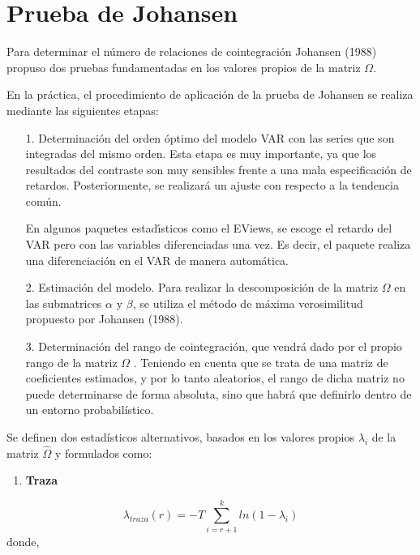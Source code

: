 \section{Prueba de Johansen}
Para determinar el n\'{u}mero de relaciones de cointegraci\'{o}n Johansen (1988) propuso dos pruebas fundamentadas en los valores propios de la matriz $\Omega$.\newline

En la pr\'{a}ctica, el procedimiento de aplicaci\'{o}n de la prueba de Johansen se realiza mediante las siguientes etapas:

\begin{enumerate}
      \item[1.] Determinaci\'{o}n del orden \'{o}ptimo del modelo VAR con las series que son integradas del mismo orden. Esta etapa es muy importante, ya que los resultados del contraste son muy sensibles frente a una mala especificaci\'{o}n de retardos. Posteriormente, se realizar\'{a} un ajuste con respecto a la tendencia com\'{u}n.
      
      En algunos paquetes estad\'{\i}sticos como el EViews, se escoge el retardo del VAR pero con las variables diferenciadas una vez. Es decir, el paquete realiza una diferenciaci\'{o}n en el VAR de manera autom\'{a}tica.

      \item[2.] Estimaci\'{o}n del modelo. Para realizar la descomposici\'{o}n de la matriz $\Omega$ en las submatrices $\alpha$ y $\beta$, se utiliza el m\'{e}todo de m\'{a}xima verosimilitud propuesto por Johansen (1988).
      \item[3.] Determinaci\'{o}n del rango de cointegraci\'{o}n, que vendr\'{a} dado por el propio rango de la matriz $\Omega$ . Teniendo en cuenta que se trata de una matriz de coeficientes estimados, y por lo tanto aleatorios, el rango de dicha matriz no puede determinarse de forma absoluta, sino que habr\'{a} que definirlo dentro de un entorno probabil\'{i}stico.
\end{enumerate}

Se definen dos estad\'{i}sticos alternativos, basados en los valores propios $\lambda_{i}$ de la matriz $\hat{\Omega }$ y formulados como:

%
%
%
%
%
%
%
%
%

\begin{enumerate}
\item \textbf{Traza}
\end{enumerate}
\[
\lambda_{traza}\left( r \right)=-T\sum\limits_{i=r+1}^k {ln(1-\lambda 
_{i})} 
\]
donde,

